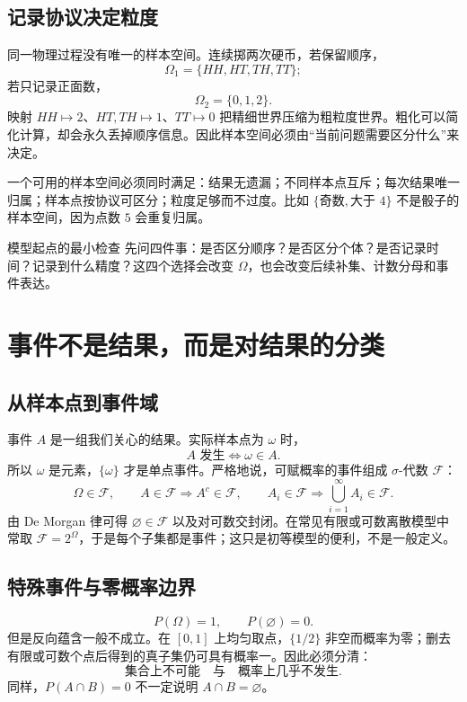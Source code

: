 \documentclass[11pt,a4paper]{ctexart}
\begin{document}
\subsection{记录协议决定粒度}

同一物理过程没有唯一的样本空间。连续掷两次硬币，若保留顺序，
\[
\Omega_1=\{HH,HT,TH,TT\};
\]
若只记录正面数，
\[
\Omega_2=\{0,1,2\}.
\]
映射 $HH\mapsto2$、$HT,TH\mapsto1$、$TT\mapsto0$ 把精细世界压缩为粗粒度世界。粗化可以简化计算，却会永久丢掉顺序信息。因此样本空间必须由“当前问题需要区分什么”来决定。

一个可用的样本空间必须同时满足：结果无遗漏；不同样本点互斥；每次结果唯一归属；样本点按协议可区分；粒度足够而不过度。比如 $\{\text{奇数},\text{大于 }4\}$ 不是骰子的样本空间，因为点数 $5$ 会重复归属。

\begin{methodbox}{模型起点的最小检查}
先问四件事：是否区分顺序？是否区分个体？是否记录时间？记录到什么精度？这四个选择会改变 $\Omega$，也会改变后续补集、计数分母和事件表达。
\end{methodbox}

\section{事件不是结果，而是对结果的分类}

\subsection{从样本点到事件域}

事件 $A$ 是一组我们关心的结果。实际样本点为 $\omega$ 时，
\[
\boxed{A\text{ 发生}\Longleftrightarrow \omega\in A.}
\]
所以 $\omega$ 是元素，$\{\omega\}$ 才是单点事件。严格地说，可赋概率的事件组成 $\sigma$-代数 $\mathcal F$：
\[
\Omega\in\mathcal F,\qquad
A\in\mathcal F\Rightarrow A^c\in\mathcal F,\qquad
A_i\in\mathcal F\Rightarrow\bigcup_{i=1}^{\infty}A_i\in\mathcal F.
\]
由 De Morgan 律可得 $\varnothing\in\mathcal F$ 以及对可数交封闭。在常见有限或可数离散模型中常取 $\mathcal F=2^\Omega$，于是每个子集都是事件；这只是初等模型的便利，不是一般定义。

\subsection{特殊事件与零概率边界}

\[
P(\Omega)=1,\qquad P(\varnothing)=0.
\]
但是反向蕴含一般不成立。在 $[0,1]$ 上均匀取点，$\{1/2\}$ 非空而概率为零；删去有限或可数个点后得到的真子集仍可具有概率一。因此必须分清：
\[
\text{集合上不可能}\quad\text{与}\quad\text{概率上几乎不发生}.
\]
同样，$P(A\cap B)=0$ 不一定说明 $A\cap B=\varnothing$。
\end{document}

